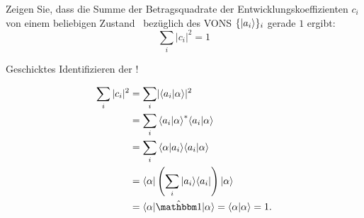 \begin{aufg}
 Zeigen Sie, dass die Summe der Betragsquadrate der Entwicklungskoeffizienten $c_i$ von einem beliebigen Zustand \keta\ bez\"uglich des VONS $\{\ket{a_i}\}_i$ gerade $1$ ergibt:
 \begin{equation}
  \sum_i |c_i|^2 = 1
 \end{equation}
\end{aufg}
\begin{tipp}
 Geschicktes Identifizieren der \opi!
\end{tipp}
\begin{loes}
 \begin{align}
  \sum_i |c_i|^2 &= \sum_i \lvert\braket{a_i|\alpha}\rvert^2 \\
  &= \sum_i \cc{\braket{a_i | \alpha}} \braket{a_i|\alpha} \\
  &= \sum_i \braket{\alpha | a_i} \braket{a_i|\alpha} \\
  &= \braa \left(\sum_i \ket{a_i}\bra{a_i} \right) \keta \\
  &= \braa \opi \keta = \braket{\alpha | \alpha} = 1.
 \end{align}
 \qedsymbol
\end{loes}


